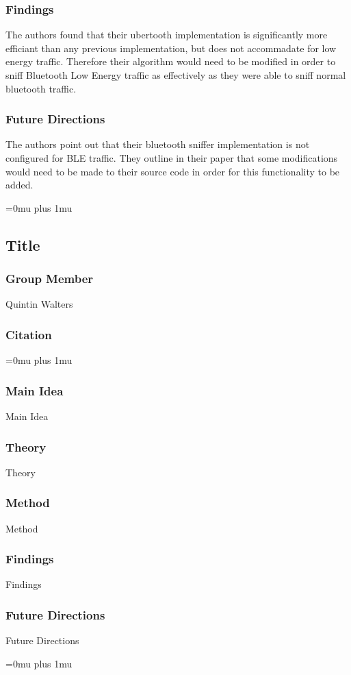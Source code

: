 \subsubsection{Findings}

\noindent
The authors found that their ubertooth implementation is significantly more efficiant than any previous implementation, but does not accommadate for low energy traffic. Therefore their algorithm would need to be modified in order to sniff Bluetooth Low Energy traffic as effectively as they were able to sniff normal bluetooth traffic.

\subsubsection{Future Directions}

\noindent
The authors point out that their bluetooth sniffer implementation is not configured for BLE traffic. They outline in their paper that some modifications would need to be made to their source code in order for this functionality to be added.

\Urlmuskip=0mu plus 1mu\relax

\noindent
\subsection{Title}

\subsubsection{Group Member}

\noindent
Quintin Walters

\noindent
\subsubsection{Citation}

\Urlmuskip=0mu plus 1mu\relax

\subsubsection{Main Idea}

\noindent
Main Idea

\subsubsection{Theory}

\noindent
Theory

\subsubsection{Method}

\noindent
Method

\subsubsection{Findings}

\noindent
Findings

\subsubsection{Future Directions}

\noindent
Future Directions 

\Urlmuskip=0mu plus 1mu\relax
\pagebreak
